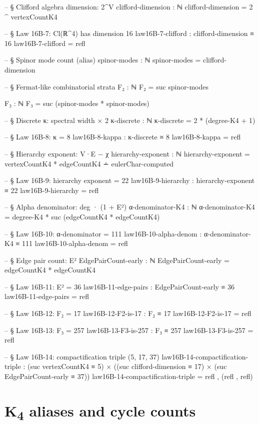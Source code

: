 \documentclass[11pt,a4paper]{book}
\begin{document}
\begin{code}
-- § Clifford algebra dimension: 2^V
clifford-dimension : ℕ
clifford-dimension = 2 ^ vertexCountK4

-- § Law 16B-7: Cl(ℝ^4) has dimension 16
law16B-7-clifford : clifford-dimension ≡ 16
law16B-7-clifford = refl

-- § Spinor mode count (alias)
spinor-modes : ℕ
spinor-modes = clifford-dimension

-- § Fermat-like combinatorial strata
F₂ : ℕ
F₂ = suc spinor-modes

F₃ : ℕ
F₃ = suc (spinor-modes * spinor-modes)

-- § Discrete κ: spectral width × 2
κ-discrete : ℕ
κ-discrete = 2 * (degree-K4 + 1)

-- § Law 16B-8: κ = 8
law16B-8-kappa : κ-discrete ≡ 8
law16B-8-kappa = refl

-- § Hierarchy exponent: V·E − χ
hierarchy-exponent : ℕ
hierarchy-exponent = vertexCountK4 * edgeCountK4 ∸ eulerChar-computed

-- § Law 16B-9: hierarchy exponent = 22
law16B-9-hierarchy : hierarchy-exponent ≡ 22
law16B-9-hierarchy = refl

-- § Alpha denominator: deg · (1 + E²)
α-denominator-K4 : ℕ
α-denominator-K4 = degree-K4 * suc (edgeCountK4 * edgeCountK4)

-- § Law 16B-10: α-denominator = 111
law16B-10-alpha-denom : α-denominator-K4 ≡ 111
law16B-10-alpha-denom = refl

-- § Edge pair count: E²
EdgePairCount-early : ℕ
EdgePairCount-early = edgeCountK4 * edgeCountK4

-- § Law 16B-11: E² = 36
law16B-11-edge-pairs : EdgePairCount-early ≡ 36
law16B-11-edge-pairs = refl

-- § Law 16B-12: F₂ = 17
law16B-12-F2-is-17 : F₂ ≡ 17
law16B-12-F2-is-17 = refl

-- § Law 16B-13: F₃ = 257
law16B-13-F3-is-257 : F₃ ≡ 257
law16B-13-F3-is-257 = refl

-- § Law 16B-14: compactification triple (5, 17, 37)
law16B-14-compactification-triple :
  (suc vertexCountK4 ≡ 5) × ((suc clifford-dimension ≡ 17) × (suc EdgePairCount-early ≡ 37))
law16B-14-compactification-triple = refl , (refl , refl)
\end{code}

\section{K\textsubscript{4} aliases and cycle counts}
\end{document}
